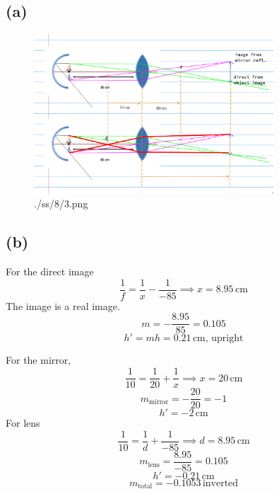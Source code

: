 \documentclass[letter]{article}
\begin{document}
\subsection*{(a)} 
\begin{figure}[H]
	\centering
	\includegraphics[width=0.8\textwidth]{./ss/8/3.png}
	\caption{./ss/8/3.png}
	\label{fig:-ss-8-3-png}
\end{figure}
\subsection*{(b)} 
For the direct image 
\[
\frac{1}{f} = \frac{1}{x} - \frac{1}{-85} \implies x = 8.95 \, \text{cm}
\]
The image is a real image.
\[
m = - \frac{8.95}{85} = 0.105
\] 
\[
	h' = mh = 0.21 \, \text{cm, upright} 
\] 

For the mirror, 
\[
\frac{1}{10} = \frac{1}{20} + \frac{1}{x} \implies x = 20 \, \text{cm}
\] 
\[
	m_\text{mirror} = - \frac{20}{20} = -1
\]
\[
h' = - 2 \, \text{cm}
\] 
For lens
\[
\frac{1}{10} = \frac{1}{d} + \frac{1}{-85} \implies d = 8.95 \, \text{cm}
\] 
\[
m_\text{lens} = \frac{8.95}{-85} = 0.105 
\] 
\[
h' = - 0.21 \, \text{cm}
\] 
\[
m_\text{total} = -0.1053 \, \text{inverted}
\] 
\end{document}
